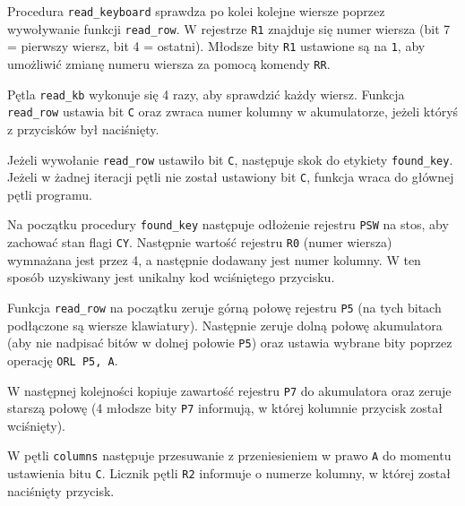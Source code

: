 \documentclass[12pt,a4paper]{article}
\begin{document}
		\begin{minipage}{.5\textwidth}
			
		\end{minipage}%
		\begin{minipage}{.5\textwidth}
			Procedura \verb|read_keyboard| sprawdza po kolei kolejne wiersze poprzez wywoływanie funkcji \verb|read_row|.
			W rejestrze \verb|R1| znajduje się numer wiersza (bit 7 = pierwszy wiersz, bit 4 = ostatni).
			Młodsze bity \verb|R1| ustawione są na \verb|1|, aby umożliwić zmianę numeru wiersza za pomocą komendy \verb|RR|.

			Pętla \verb|read_kb| wykonuje się 4 razy, aby sprawdzić każdy wiersz.
			Funkcja \verb|read_row| ustawia bit \verb|C| oraz zwraca numer kolumny w akumulatorze, jeżeli któryś z przycisków był naciśnięty.
			
			Jeżeli wywołanie \verb|read_row| ustawiło bit \verb|C|, następuje skok do etykiety \verb|found_key|.
			Jeżeli w żadnej iteracji pętli nie został ustawiony bit \verb|C|, funkcja wraca do głównej pętli programu.

			Na początku procedury \verb|found_key| następuje odłożenie rejestru \verb|PSW| na stos, aby zachować stan flagi \verb|CY|.
			Następnie wartość rejestru \verb|R0| (numer wiersza) wymnażana jest przez 4, a następnie dodawany jest numer kolumny.
			W ten sposób uzyskiwany jest unikalny kod wciśniętego przycisku.
		\end{minipage}
		
		\begin{minipage}{.5\textwidth}
			
		\end{minipage}%
		\begin{minipage}{.5\textwidth}
			Funkcja \verb|read_row| na początku zeruje górną połowę rejestru \verb|P5| (na tych bitach podłączone są wiersze klawiatury).
			Następnie zeruje dolną połowę akumulatora (aby nie nadpisać bitów w dolnej połowie \verb|P5|)
			oraz ustawia wybrane bity poprzez operację \verb|ORL P5, A|.

			W następnej kolejności kopiuje zawartość rejestru \verb|P7|
			do akumulatora oraz zeruje starszą połowę (4 młodsze bity \verb|P7| informują,
			w której kolumnie przycisk został wciśnięty).

			W pętli \verb|columns| następuje przesuwanie z przeniesieniem w prawo \verb|A| do momentu ustawienia bitu \verb|C|.
			Licznik pętli \verb|R2| informuje o numerze kolumny, w której został naciśnięty przycisk.
		\end{minipage}
\end{document}
